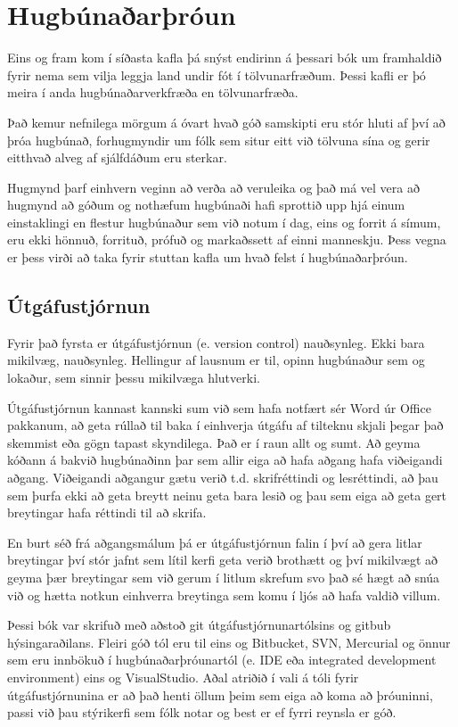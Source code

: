 
\chapter{Hugbúnaðarþróun}\label{k:dev}
Eins og fram kom í síðasta kafla þá snýst endirinn á þessari bók um framhaldið fyrir nema sem vilja leggja land undir fót í tölvunarfræðum.
Þessi kafli er þó meira í anda hugbúnaðarverkfræða en tölvunarfræða.

Það kemur nefnilega mörgum á óvart hvað góð samskipti eru stór hluti af því að þróa hugbúnað, forhugmyndir um fólk sem situr eitt við tölvuna sína og gerir eitthvað alveg af sjálfdáðum eru sterkar.

Hugmynd þarf einhvern veginn að verða að veruleika og það má vel vera að hugmynd að góðum og nothæfum hugbúnaði hafi sprottið upp hjá einum einstaklingi en flestur hugbúnaður sem við notum í dag, eins og forrit á símum, eru ekki hönnuð, forrituð, prófuð og markaðssett af einni manneskju.
Þess vegna er þess virði að taka fyrir stuttan kafla um hvað felst í hugbúnaðarþróun.

\section{Útgáfustjórnun}
Fyrir það fyrsta er útgáfustjórnun (e. version control) nauðsynleg.
Ekki bara mikilvæg, nauðsynleg.
Hellingur af lausnum er til, opinn hugbúnaður sem og lokaður, sem sinnir þessu mikilvæga hlutverki.

Útgáfustjórnun kannast kannski sum við sem hafa notfært sér Word úr Office pakkanum, að geta rúllað til baka í einhverja útgáfu af tilteknu skjali þegar það skemmist eða gögn tapast skyndilega.
Það er í raun allt og sumt.
Að geyma kóðann á bakvið hugbúnaðinn þar sem allir eiga að hafa aðgang hafa viðeigandi aðgang.
Viðeigandi aðgangur gætu verið t.d. skrifréttindi og lesréttindi, að þau sem þurfa ekki að geta breytt neinu geta bara lesið og þau sem eiga að geta gert breytingar hafa réttindi til að skrifa.

En burt séð frá aðgangsmálum þá er útgáfustjórnun falin í því að gera litlar breytingar því stór jafnt sem lítil kerfi geta verið brothætt og því mikilvægt að geyma þær breytingar sem við gerum í litlum skrefum svo það sé hægt að snúa við og hætta notkun einhverra breytinga sem komu í ljós að hafa valdið villum.

Þessi bók var skrifuð með aðstoð git útgáfustjórnunartólsins og gitbub hýsingaraðilans.
Fleiri góð tól eru til eins og Bitbucket, SVN, Mercurial og önnur sem eru innbökuð í hugbúnaðarþróunartól (e. IDE eða integrated development environment) eins og VisualStudio.
Aðal atriðið í vali á tóli fyrir útgáfustjórnunina er að það henti öllum þeim sem eiga að koma að þróuninni, passi við þau stýrikerfi sem fólk notar og best er ef fyrri reynsla er góð.

